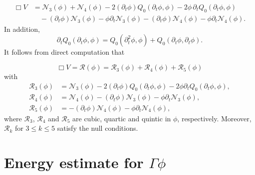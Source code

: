 \documentclass[11pt,twoside]{article}
\theoremstyle{plain}
\theoremstyle{definition}
\theoremstyle{assumption}
\numberwithin{equation}{section}
\begin{document}
		\begin{equation}
		\label{eq:box-V-final-expanded}
		\begin{split}
			\Box V
			&=
			\mathcal N_3(\phi)
			+
			\mathcal N_4(\phi)
			-
			2(\partial_t\phi)Q_0(\partial_t\phi,\phi)
			-
			2\phi\,\partial_t Q_0(\partial_t\phi,\phi)\\
			&\quad
			-
			(\partial_t\phi)\mathcal N_3(\phi)
			-
			\phi\partial_t\mathcal N_3(\phi)
			-
			(\partial_t\phi)\mathcal N_4(\phi)
			-
			\phi\partial_t\mathcal N_4(\phi).
		\end{split}
	\end{equation}
	In addition,
	\begin{equation}
		\label{eq:dt-Q0-identity-V-section}
		\partial_tQ_0(\partial_t\phi,\phi)
		=
		Q_0(\partial_t^2\phi,\phi)
		+
		Q_0(\partial_t\phi,\partial_t\phi).
	\end{equation}
It follows from direct computation that

	\begin{equation}
		\label{eq:box-V-schematic-null}
		\Box V
		=\mathcal R(\phi)=
		\mathcal R_3(\phi)
		+\mathcal R_4(\phi)
		+\mathcal R_5(\phi)
	\end{equation}
	with
	\begin{equation}
		\label{eq:R3R4R5-definition}
		\begin{split}
			\mathcal R_3(\phi)
			&=
			\mathcal N_3(\phi)
			-
			2(\partial_t\phi)Q_0(\partial_t\phi,\phi)
			-
			2\phi\partial_tQ_0(\partial_t\phi,\phi),  \\
			\mathcal R_4(\phi)
			&=
			\mathcal N_4(\phi)
			-
			(\partial_t\phi)\mathcal N_3(\phi)
			-
			\phi\partial_t\mathcal N_3(\phi),  \\
			\mathcal R_5(\phi)
			&=
			-
			(\partial_t\phi)\mathcal N_4(\phi)
			-
			\phi\partial_t\mathcal N_4(\phi),
		\end{split}
	\end{equation}
	where \(\mathcal R_3\), \(\mathcal R_4\) and \(\mathcal R_5\) are cubic,
	quartic and quintic in \(\phi\), respectively. Moreover, \(\mathcal R_k\) for $3\le k\le 5$
	satisfy the null conditions.
	
	
	
	

	
	\section{Energy estimate for $\Gamma\phi$}
	\label{sec:CVP-one-Gamma-energy-closure}
	
\end{document}
